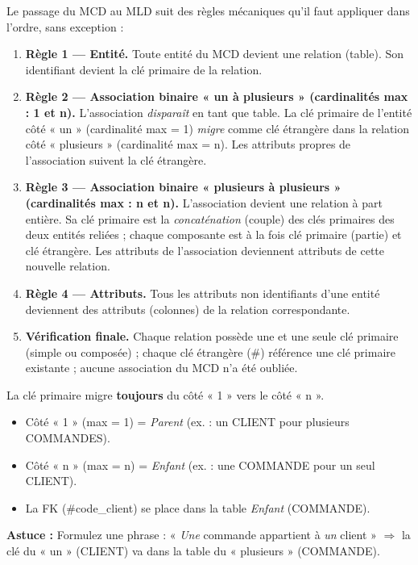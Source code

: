 \documentclass[11pt]{article}
\newcommand{\cle}[1]{{\popxbold\color{popdark}#1}}
\begin{document}
\begin{methode}
Le passage du MCD au MLD suit des \cle{règles mécaniques} qu'il faut appliquer dans l'ordre, sans exception :

\begin{enumerate}
\item \textbf{Règle 1 — Entité.} Toute \cle{entité} du MCD devient une \cle{relation} (table). Son \cle{identifiant} devient la \cle{clé primaire} de la relation.
\item \textbf{Règle 2 — Association binaire « un à plusieurs » (cardinalités max : 1 et n).} L'association \emph{disparaît} en tant que table. La clé primaire de l'entité côté « un » (cardinalité max = 1) \emph{migre} comme \cle{clé étrangère} dans la relation côté « plusieurs » (cardinalité max = n). Les attributs propres de l'association suivent la clé étrangère.
\item \textbf{Règle 3 — Association binaire « plusieurs à plusieurs » (cardinalités max : n et n).} L'association devient une \cle{relation} à part entière. Sa clé primaire est la \emph{concaténation} (couple) des clés primaires des deux entités reliées ; chaque composante est à la fois clé primaire (partie) et clé étrangère. Les attributs de l'association deviennent attributs de cette nouvelle relation.
\item \textbf{Règle 4 — Attributs.} Tous les attributs non identifiants d'une entité deviennent des attributs (colonnes) de la relation correspondante.
\item \textbf{Vérification finale.} Chaque relation possède une et une seule clé primaire (simple ou composée) ; chaque clé étrangère (\#) référence une clé primaire existante ; aucune association du MCD n'a été oubliée.
\end{enumerate}
\end{methode}

\begin{attention}
La clé primaire migre \textbf{toujours} du côté « 1 » vers le côté « n ».
\begin{itemize}
\item Côté « 1 » (max = 1) = \emph{Parent} (ex. : un CLIENT pour plusieurs COMMANDES).
\item Côté « n » (max = n) = \emph{Enfant} (ex. : une COMMANDE pour un seul CLIENT).
\item La FK (\#code\_client) se place dans la table \emph{Enfant} (COMMANDE).
\end{itemize}
\textbf{Astuce :} Formulez une phrase : « \emph{Une} commande appartient à \emph{un} client » $\Rightarrow$ la clé du « un » (CLIENT) va dans la table du « plusieurs » (COMMANDE).
\end{attention}
\end{document}
